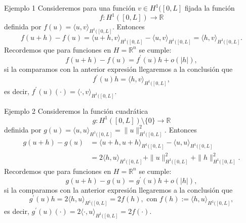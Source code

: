 \documentclass[10pt,handout]{beamer}
\theoremstyle{plain} %
\theoremstyle{plain} %
\theoremstyle{plain} %
\theoremstyle{plain} %
\theoremstyle{definition}
\theoremstyle{example}
\theoremstyle{example}
\theoremstyle{remark}
\theoremstyle{remark}
\begin{document}
\begin{frame}{Ejemplo 1}
Consideremos para una función $v \in H^1([0,L]$ fijada la función 
$$
f:H^1([0,L]) \longrightarrow \mathbb{R}
$$
definida por $f(u)=\langle u, v\rangle_{ H^1([0,L]}.$ Entonces
$$
f(u+h)-f(u) = \langle u+h, v\rangle_{ H^1([0,L]} - \langle u, v\rangle_{ H^1([0,L]} = \langle h, v\rangle_{ H^1([0,L]}.
$$
Recordemos que para funciones en $H=\mathbb{R}^n$ se cumple:
$$
f(u+h)-f(u) = f^{\prime}(u)h + o(|h|),
$$
si la comparamos con la anterior expresión llegaremos a la conclusión que
$$
f^{\prime}(u)h = \langle h, v\rangle_{ H^1([0,L]},
$$
es decir, $f^{\prime}(u) (\cdot) =\langle \cdot, v \rangle_{H^1([0,L]}.$
\end{frame}

\begin{frame}{Ejemplo 2}
    Consideremos la función cuadrática 
    $$
    g:H^1([0,L])\setminus\{0\} \longrightarrow \mathbb{R}
    $$
    definida por $g(u)=\langle u, u\rangle_{ H^1([0,L]} = \|u\|_{H^1([0,L]}^2.$ Entonces
    \begin{align*}
    g(u+h)-g(u) & = \langle u+h, u+h\rangle_{ H^1([0,L]} - \langle u, u\rangle_{ H^1([0,L]} \\ 
    & =  2 \langle h, u\rangle_{ H^1([0,L]} + \|u\|_{ H^1([0,L]}^2 +\|h\|_{ H^1([0,L]}^2.
    \end{align*}
    Recordemos que para funciones en $H=\mathbb{R}^n$ se cumple:
    $$
    g(u+h)-g(u) = g^{\prime}(u)h + o(|h|),
    $$
    si la comparamos con la anterior expresión llegaremos a la conclusión que
    $$
    g^{\prime}(u)h = 2 \langle h, u\rangle_{ H^1([0,L]} = 2f(h), \text{ con } f(h):= \langle h, u\rangle_{ H^1([0,L]},
    $$
    es decir, $g^{\prime}(u) (\cdot) =2 \langle \cdot, u \rangle_{H^1([0,L]} = 2f(\cdot).$
    \end{frame}
    
\end{document}
